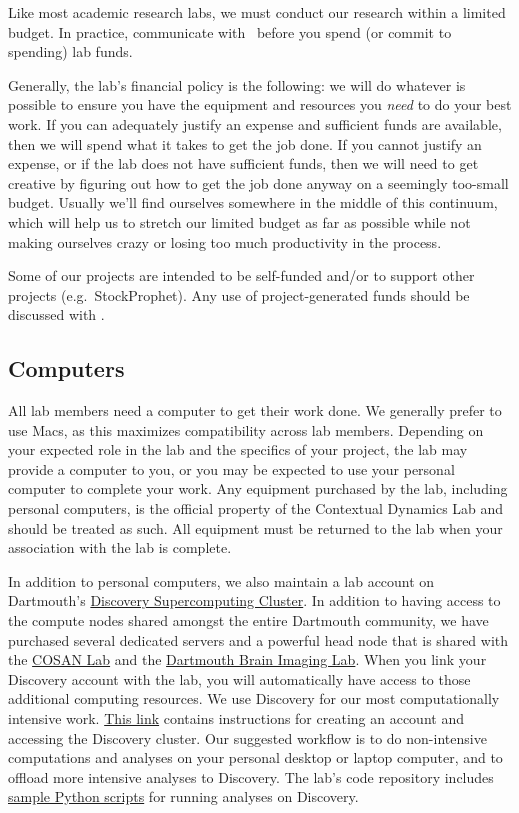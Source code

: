 \documentclass{tufte-book} %
\begin{document}
 \noindent Like most academic research labs, we must
 conduct our research within a limited budget.  In practice,
 communicate with \director~before you spend
 (or commit to spending) lab funds.

 Generally, the lab's financial policy is the following: we will do
 whatever is possible to ensure you have the equipment and resources
 you \textit{need} to do your best work.  If you can adequately
 justify an expense and sufficient funds are available, then we will
 spend what it takes to get the job done.  If you cannot justify an
 expense, or if the lab does not have sufficient funds, then we will
 need to get creative by figuring out how to get the job done anyway
 on a seemingly too-small budget.  Usually we'll find ourselves
 somewhere in the middle of this continuum, which will help us to
 stretch our limited budget as far as possible while not making
 ourselves crazy or losing too much productivity in the process.

 Some of our projects are intended to be self-funded and/or to support
 other projects (e.g.\ StockProphet).  Any use of project-generated
 funds should be discussed with \director.

 \subsection{Computers}

 All lab members need a computer to get their work done.  We generally
 prefer to use Macs, as this maximizes compatibility across lab
 members.  Depending on your expected role in the lab and the
 specifics of your project, the lab may provide a computer to you, or
 you may be expected to use your personal computer to complete your
 work.  Any equipment purchased by the lab, including personal
 computers, is the official property of the Contextual Dynamics Lab
 and should be treated as such.  All equipment must be returned to the
 lab when your association with the lab is complete.

 In addition to personal computers, we also maintain a lab account on
 Dartmouth's \href{http://techdoc.dartmouth.edu/discovery/}{Discovery
   Supercomputing Cluster}.  In addition to having access to the
 compute nodes shared amongst the entire Dartmouth community, we have
 purchased several dedicated servers and a powerful head node that is
 shared with the \href{http://www.cosanlab.com/}{COSAN Lab} and the
 \href{http://www.dartmouth.edu/~bil/}{Dartmouth Brain Imaging Lab}.
 When you link your Discovery account with the lab, you will
 automatically have access to those additional computing resources.
 We use Discovery for our most computationally intensive work.
 \href{https://rc.dartmouth.edu/index.php/discovery-overview/accessing-the-cluster}{This
   link} contains instructions for creating an account and
 accessing the Discovery cluster.  Our suggested workflow is to do non-intensive
 computations and analyses on your personal desktop or laptop
 computer, and to offload more intensive analyses to Discovery.  The
 lab's code repository includes
 \href{https://github.com/ContextLab/cluster-tools-dartmouth}{sample
   Python scripts} for running analyses on Discovery.
\end{document}
